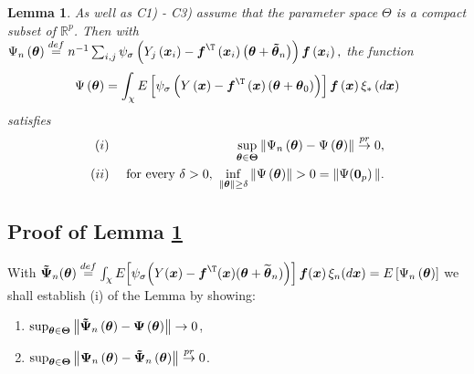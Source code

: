\documentclass[times, authoryear, 12pt, twoside]{elsarticle}
\newtheorem{lemma}{Lemma}
\begin{document}
\begin{lemma}
\label{lemma: limit} As well as C1) - C3) assume that the parameter space $%
\Theta $ is a compact subset of $\mathbb{R}^{p}$. Then with $\Psi _{n}\left( 
\boldsymbol{\theta }\right) \overset{def}{=}n^{-1}\sum_{i,j}\psi _{\sigma
}\left( Y_{j}\left( \boldsymbol{x}_{i}\right) -\boldsymbol{f}^{\T
}\left( \boldsymbol{x}_{i}\right) \left( \boldsymbol{\theta }+\boldsymbol{%
\tilde{\theta}}_{n}\right) \right) \boldsymbol{f}\left( \boldsymbol{x}%
_{i}\right) ,$ the function 
\begin{equation*}
\Psi \left( \boldsymbol{\theta }\right) =\int_{\mathcal{\chi }}E\left[ \psi
_{\sigma }\left( Y\left( \boldsymbol{x}\right) -\boldsymbol{f}^{\T
}\left( \boldsymbol{x}\right) \left( \boldsymbol{\theta }+\boldsymbol{\theta 
}_{0}\right) \right) \right] \boldsymbol{f}\left( \boldsymbol{x}\right) \xi
_{\ast }\left( d\boldsymbol{x}\right)
\end{equation*}%
satisfies 
\begin{eqnarray*}
(i) &&\sup_{\boldsymbol{\theta }\in \boldsymbol{\Theta }}\left\Vert \Psi _{n}\left( \boldsymbol{%
\theta }\right) -\Psi \left( \boldsymbol{\theta }\right) \right\Vert \overset%
{pr}{\rightarrow }0, \\
(ii) &\text{ }&\text{for every }\delta >0\text{, }\inf_{\left\Vert 
\boldsymbol{\theta }\right\Vert \geq \delta }\left\Vert \Psi \left( 
\boldsymbol{\theta }\right) \right\Vert >0=\left\Vert\Psi ( \boldsymbol{0}_p\right)\Vert
.
\end{eqnarray*}
\end{lemma}


\subsection{Proof of Lemma \protect\ref{lemma: limit}}

With $\boldsymbol{\tilde{\Psi}}_{n}(\boldsymbol{\theta })\overset{def}{=}%
\int_{\chi }E\!\left[ \psi _{\sigma }\!\left( Y(\boldsymbol{x})-\boldsymbol{f%
}^{\T }(\boldsymbol{x})(\boldsymbol{\theta }+\widetilde{\boldsymbol{%
\theta }}_{n})\right) \right] \boldsymbol{f}(\boldsymbol{x})\,\xi _{n}(d%
\boldsymbol{x})=E\left[ \Psi _{n}\left( \boldsymbol{\theta }\right) \right] $
we shall establish (i) of the Lemma by showing:

\begin{enumerate}
\item[(a)] $\sup_{\boldsymbol{\theta }\in \boldsymbol{\Theta }}\left\Vert 
\boldsymbol{\tilde{\Psi}}_{n}\left( \boldsymbol{\theta }\right) -\boldsymbol{%
\Psi }\left( \boldsymbol{\theta }\right) \right\Vert \rightarrow 0$,

\item[(b)] $\sup_{\boldsymbol{\theta }\in \boldsymbol{\Theta }}\left\Vert 
\boldsymbol{\Psi }_{n}\left( \boldsymbol{\theta }\right) -\boldsymbol{\tilde{%
\Psi}}_{n}\left( \boldsymbol{\theta }\right) \right\Vert \overset{pr}{%
\rightarrow }0$.
\end{enumerate}
\end{document}
